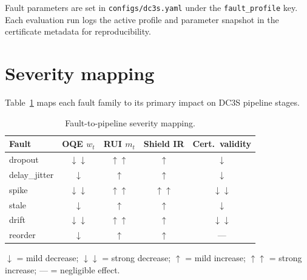 \noindent
Fault parameters are set in \texttt{configs/dc3s.yaml} under the
\texttt{fault\_profile} key.  Each evaluation run logs the active
profile and parameter snapshot in the certificate metadata for
reproducibility.

\section{Severity mapping}

Table~\ref{tab:fault-severity} maps each fault family to its
primary impact on DC3S pipeline stages.

\begin{table}[htbp]
\centering
\caption{Fault-to-pipeline severity mapping.}
\label{tab:fault-severity}
\small
\begin{tabular}{@{}lcccc@{}}
\toprule
\textbf{Fault}
  & \textbf{OQE $w_t$}
  & \textbf{RUI $m_t$}
  & \textbf{Shield IR}
  & \textbf{Cert.\ validity} \\
\midrule
dropout        & $\downarrow\downarrow$   & $\uparrow\uparrow$   & $\uparrow$   & $\downarrow$   \\
delay\_jitter  & $\downarrow$             & $\uparrow$            & $\uparrow$   & $\downarrow$   \\
spike          & $\downarrow\downarrow$   & $\uparrow\uparrow$   & $\uparrow\uparrow$ & $\downarrow\downarrow$ \\
stale          & $\downarrow$             & $\uparrow$            & $\uparrow$   & $\downarrow$   \\
drift          & $\downarrow\downarrow$   & $\uparrow\uparrow$   & $\uparrow$   & $\downarrow\downarrow$ \\
reorder        & $\downarrow$             & $\uparrow$            & $\uparrow$   & ---                     \\
\bottomrule
\end{tabular}
\medskip

\footnotesize
$\downarrow$ = mild decrease; $\downarrow\downarrow$ = strong decrease;
$\uparrow$ = mild increase; $\uparrow\uparrow$ = strong increase;
--- = negligible effect.
\end{table}
